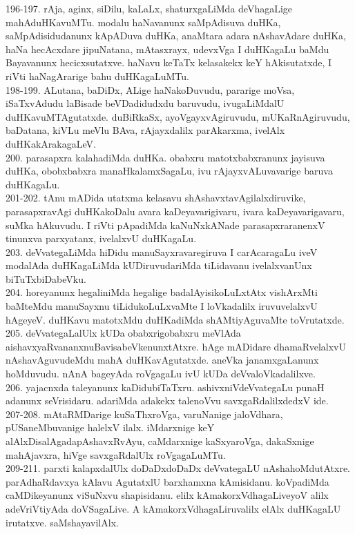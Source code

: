 \documentclass{article}
\begin{document}
196-197. rAja, aginx, siDilu, kaLaLx, shaturxgaLiMda deVhagaLige mahAduHKavuMTu. modalu haNavanunx saMpAdisuva duHKa, saMpAdisidudanunx kApADuva duHKa, anaMtara adara nAshavAdare duHKa, haNa hecAcxdare jipuNatana, mAtasxrayx, udevxVga I duHKagaLu baMdu Bayavanunx hecicxsutatxve. haNavu keTaTx kelasakekx keY hAkisutatxde, I riVti haNagArarige bahu duHKagaLuMTu.\\
198-199. ALutana, baDiDx, ALige haNakoDuvudu, pararige moVsa, iSaTxvAdudu laBisade beVDadidudxdu baruvudu, ivugaLiMdalU duHKavuMTAgutatxde. duBiRkaSx, ayoVgayxvAgiruvudu, mUKaRnAgiruvudu, baDatana, kiVLu meVlu BAva, rAjayxdalilx parAkarxma, ivelAlx duHKakArakagaLeV.\\
200. parasapxra kalahadiMda duHKa. obabxru matotxbabxranunx jayisuva duHKa, obobxbabxra manaHkalamxSagaLu, ivu rAjayxvALuvavarige baruva duHKagaLu.\\
201-202. tAnu mADida utatxma kelasavu shAshavxtavAgilalxdiruvike, parasapxravAgi duHKakoDalu avara kaDeyavarigivaru, ivara kaDeyavarigavaru, suMka hAkuvudu. I riVti pApadiMda kaNuNxkANade parasapxraranenxV tinunxva parxyatanx, ivelalxvU duHKagaLu.\\
203. deVvategaLiMda hiDidu manuSayxravaregiruva I carAcaragaLu iveV modalAda duHKagaLiMda kUDiruvudariMda tiLidavanu ivelalxvanUnx biTuTxbiDabeVku.\\
204. horeyanunx hegaliniMda hegalige badalAyisikoLuLxtAtx vishArxMti baMteMdu manuSayxnu tiLidukoLuLxvaMte I loVkadalilx iruvuvelalxvU hAgeyeV. duHKavu matotxMdu duHKadiMda shAMtiyAguvaMte toVrutatxde.\\
205. deVvategaLalUlx kUDa obabxrigobabxru meVlAda aishavxyaRvananxnuBavisabeVkenunxtAtxre. hAge mADidare dhamaRvelalxvU nAshavAguvudeMdu mahA duHKavAgutatxde. aneVka janamxgaLanunx hoMduvudu. nAnA bageyAda roVgagaLu ivU kUDa deVvaloVkadalilxve.\\
206. yajacnxda taleyanunx kaDidubiTaTxru. ashivxniVdeVvategaLu punaH adanunx seVrisidaru. adariMda adakekx talenoVvu savxgaRdalilxdedxV ide.\\
207-208. mAtaRMDarige kuSaThxroVga, varuNanige jaloVdhara, pUSaneMbuvanige halelxV ilalx. iMdarxnige keY alAlxDisalAgadapAshavxRvAyu, caMdarxnige kaSxyaroVga, dakaSxnige mahAjavxra, hiVge savxgaRdalUlx roVgagaLuMTu.\\
209-211. parxti kalapxdalUlx doDaDxdoDaDx deVvategaLU nAshahoMdutAtxre. parAdhaRdavxya kAlavu AgutatxlU barxhamxna kAmisidanu. koVpadiMda caMDikeyanunx viSuNxvu shapisidanu. elilx kAmakorxVdhagaLiveyoV alilx adeVriVtiyAda doVSagaLive. A kAmakorxVdhagaLiruvalilx elAlx duHKagaLU irutatxve. saMshayavilAlx.\\
\end{document}
